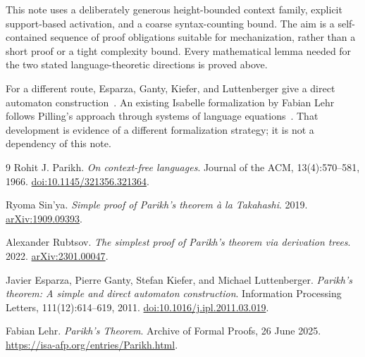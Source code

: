 \documentclass[11pt,a4paper]{article}
\numberwithin{equation}{section}
\theoremstyle{plain}
\theoremstyle{definition}
\theoremstyle{remark}
\begin{document}
This note uses a deliberately generous height-bounded context family, explicit support-based activation, and a coarse syntax-counting bound. The aim is a self-contained sequence of proof obligations suitable for mechanization, rather than a short proof or a tight complexity bound. Every mathematical lemma needed for the two stated language-theoretic directions is proved above.

For a different route, Esparza, Ganty, Kiefer, and Luttenberger give a direct automaton construction~\cite{esparza}. An existing Isabelle formalization by Fabian Lehr follows Pilling's approach through systems of language equations~\cite{lehr}. That development is evidence of a different formalization strategy; it is not a dependency of this note.

\Needspace{75mm}
\begin{thebibliography}{9}
Rohit J. Parikh.
\emph{On context-free languages}.
Journal of the ACM, 13(4):570--581, 1966.
\href{https://doi.org/10.1145/321356.321364}{doi:10.1145/321356.321364}.

Ryoma Sin'ya.
\emph{Simple proof of Parikh's theorem \`a la Takahashi}.
2019. \href{https://arxiv.org/abs/1909.09393}{arXiv:1909.09393}.

Alexander Rubtsov.
\emph{The simplest proof of Parikh's theorem via derivation trees}.
2022. \href{https://arxiv.org/abs/2301.00047}{arXiv:2301.00047}.

Javier Esparza, Pierre Ganty, Stefan Kiefer, and Michael Luttenberger.
\emph{Parikh's theorem: A simple and direct automaton construction}.
Information Processing Letters, 111(12):614--619, 2011.
\href{https://doi.org/10.1016/j.ipl.2011.03.019}{doi:10.1016/j.ipl.2011.03.019}.

Fabian Lehr.
\emph{Parikh's Theorem}.
Archive of Formal Proofs, 26 June 2025.
\url{https://isa-afp.org/entries/Parikh.html}.
\end{thebibliography}
\end{document}
